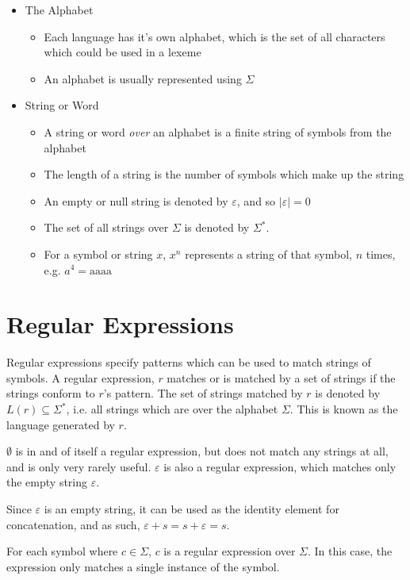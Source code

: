\begin{itemize}
  \item The Alphabet
  \begin{itemize}
    \item Each language has it's own alphabet, which is the set of all characters which could be used in a lexeme
    \item An alphabet is usually represented using $\Sigma$
  \end{itemize}
  \item String or Word
  \begin{itemize}
    \item A string or word \textit{over} an alphabet is a finite string of symbols from the alphabet
    \item The length of a string is the number of symbols which make up the string
    \item An empty or null string is denoted by $\varepsilon$, and so $\mid \varepsilon \mid = 0$
    \item The set of all strings over $\Sigma$ is denoted by $\Sigma^*$.
    \item For a symbol or string $x$, $x^n$ represents a string of that symbol, $n$ times, e.g. $a^4 = \mathrm{aaaa}$ 
  \end{itemize}
\end{itemize}

\section*{Regular Expressions}

Regular expressions specify patterns which can be used to match strings of symbols. A regular expression, $r$ matches
 or is matched by a set of strings if the strings conform to $r$'s pattern. The set of strings matched by $r$ is
 denoted by $L(r) \subseteq \Sigma^*$, i.e. all strings which are over the alphabet $\Sigma$. This is known as the
 language generated by $r$.

$\emptyset$ is in and of itself a regular expression, but does not match any strings at all, and is only very rarely
 useful. $\varepsilon$ is also a regular expression, which matches only the empty string $\varepsilon$.

Since $\varepsilon$ is an empty string, it can be used as the identity element for concatenation, and as such,
 $\varepsilon + s = s + \varepsilon = s$.

For each symbol where $c \in \Sigma$, $c$ is a regular expression over $\Sigma$. In this case, the expression only
 matches a single instance of the symbol. 

